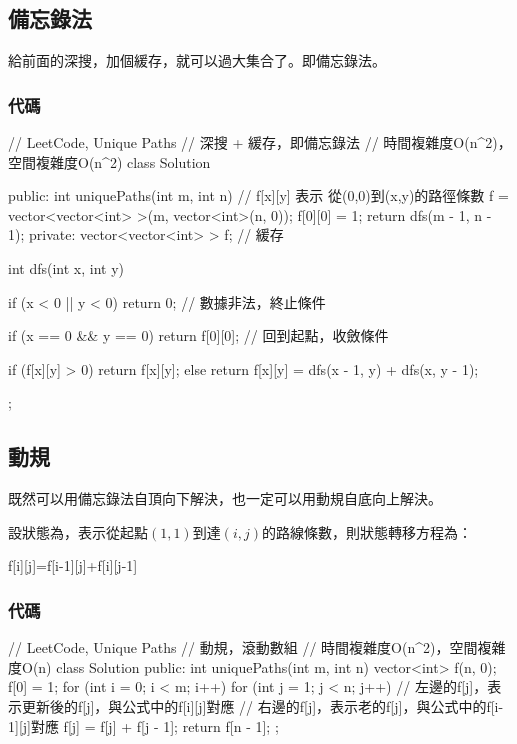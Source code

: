 \subsection{備忘錄法}
給前面的深搜，加個緩存，就可以過大集合了。即備忘錄法。

\subsubsection{代碼}
\begin{Code}
// LeetCode, Unique Paths
// 深搜 + 緩存，即備忘錄法
// 時間複雜度O(n^2)，空間複雜度O(n^2)
class Solution {
public:
    int uniquePaths(int m, int n) {
        // f[x][y] 表示 從(0,0)到(x,y)的路徑條數
        f = vector<vector<int> >(m, vector<int>(n, 0));
        f[0][0] = 1;
        return dfs(m - 1, n - 1);
    }
private:
    vector<vector<int> > f;  // 緩存

    int dfs(int x, int y) {
        if (x < 0 || y < 0) return 0; // 數據非法，終止條件

        if (x == 0 && y == 0) return f[0][0]; // 回到起點，收斂條件

        if (f[x][y] > 0) {
            return f[x][y];
        } else {
            return f[x][y] = dfs(x - 1, y) +  dfs(x, y - 1);
        }
    }
};
\end{Code}


\subsection{動規}
既然可以用備忘錄法自頂向下解決，也一定可以用動規自底向上解決。

設狀態為，表示從起點$(1,1)$到達$(i,j)$的路線條數，則狀態轉移方程為：
\begin{Code}
f[i][j]=f[i-1][j]+f[i][j-1]
\end{Code}


\subsubsection{代碼}
\begin{Code}
// LeetCode, Unique Paths
// 動規，滾動數組
// 時間複雜度O(n^2)，空間複雜度O(n)
class Solution {
public:
    int uniquePaths(int m, int n) {
        vector<int> f(n, 0);
        f[0] = 1;
        for (int i = 0; i < m; i++) {
            for (int j = 1; j < n; j++) {
                // 左邊的f[j]，表示更新後的f[j]，與公式中的f[i][j]對應
                // 右邊的f[j]，表示老的f[j]，與公式中的f[i-1][j]對應
                f[j] = f[j] + f[j - 1];
            }
        }
        return f[n - 1];
    }
};
\end{Code}


